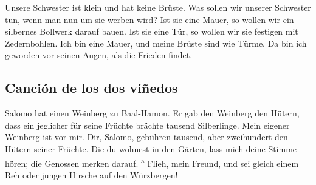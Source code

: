  Unsere Schwester ist klein und hat keine Brüste. Was
sollen wir unserer Schwester tun, wenn man nun um sie werben wird?
 Ist sie eine Mauer, so wollen wir ein silbernes Bollwerk
darauf bauen. Ist sie eine Tür, so wollen wir sie festigen mit
Zedernbohlen.  Ich bin eine Mauer, und meine Brüste sind
wie Türme. Da bin ich geworden vor seinen Augen, als die Frieden findet.

\hypertarget{canciuxf3n-de-los-dos-viuxf1edos}{%
\subsection{Canción de los dos
viñedos}\label{canciuxf3n-de-los-dos-viuxf1edos}}

 Salomo hat einen Weinberg zu Baal-Hamon. Er gab den
Weinberg den Hütern, dass ein jeglicher für seine Früchte brächte
tausend Silberlinge.  Mein eigener Weinberg ist vor mir.
Dir, Salomo, gebühren tausend, aber zweihundert den Hütern seiner
Früchte.  Die du wohnest in den Gärten, lass mich deine
Stimme hören; die Genossen merken darauf. \textsuperscript{a}
 Flieh, mein Freund, und sei gleich einem Reh oder jungen
Hirsche auf den Würzbergen!
